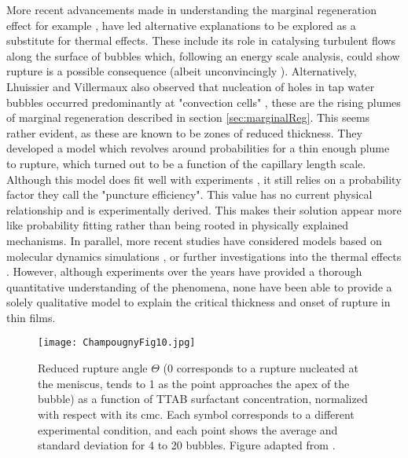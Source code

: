 \documentclass[a4paper,12pt]{article}
\numberwithin{equation}{section}
\numberwithin{figure}{section}
\numberwithin{table}{section}
\begin{document}
More recent advancements made in understanding the marginal regeneration effect for example \cite{Bhamla2017}, have led alternative explanations to be explored as a substitute for thermal effects. These include its role in catalysing turbulent flows along the surface of bubbles which, following an energy scale analysis, could show rupture is a possible consequence (albeit unconvincingly \cite{Lhuissier2011}). Alternatively, Lhuissier and Villermaux also observed that nucleation of holes in tap water bubbles occurred predominantly at "convection cells" \cite{Lhuissier2011}, these are the rising plumes of marginal regeneration described in section \ref{sec:marginalReg}. This seems rather evident, as these are known to be zones of reduced thickness. They developed a model which revolves around probabilities for a thin enough plume to rupture, which turned out to be a function of the capillary length scale. Although this model does fit well with experiments \cite{Modini2013}, it still relies on a probability factor they call the "puncture efficiency". This value has no current physical relationship and is experimentally derived. This makes their solution appear more like probability fitting rather than being rooted in physically explained mechanisms. In parallel, more recent studies have considered models based on molecular dynamics simulations \cite{Nguyen2014}, or further investigations into the thermal effects \cite{Shah2019}. However, although experiments over the years have provided a thorough quantitative understanding of the phenomena, none have been able to provide a solely qualitative model to explain the critical thickness and onset of rupture in thin films.

\begin{figure}[!htbp]
    \centering
    \captionsetup{width=.9\linewidth}
    \texttt{[image: ChampougnyFig10.jpg]}
    \caption{Reduced rupture angle $\Theta$ (0 corresponds to a rupture nucleated at the meniscus, tends to 1 as the point approaches the apex of the bubble) as a function of TTAB surfactant concentration, normalized with respect with its cmc. Each symbol corresponds to a different experimental condition, and each point shows the average and standard deviation for 4 to 20 bubbles. Figure adapted from \cite{ChampougnyNotBare2016}.}
    \label{fig:ChampougnyFig10}
\end{figure}
\end{document}
